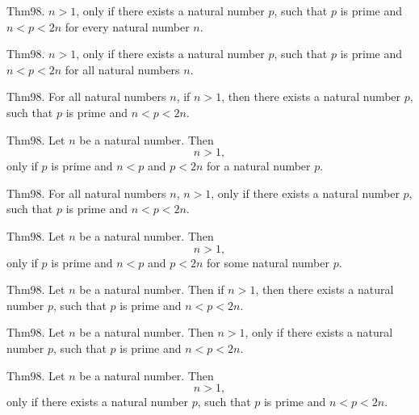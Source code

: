 \documentclass{article}
\begin{document}
Thm98. $n > 1$, only if there exists a natural number $p$, such that $p$ is prime and $n < p < 2 n$ for every natural number $n$.

Thm98. $n > 1$, only if there exists a natural number $p$, such that $p$ is prime and $n < p < 2 n$ for all natural numbers $n$.

Thm98. For all natural numbers $n$, if $n > 1$, then there exists a natural number $p$, such that $p$ is prime and $n < p < 2 n$.

Thm98. Let $n$ be a natural number. Then $$n > 1,$$ only if $p$ is prime and $n < p$ and $p < 2 n$ for a natural number $p$.

Thm98. For all natural numbers $n$, $n > 1$, only if there exists a natural number $p$, such that $p$ is prime and $n < p < 2 n$.

Thm98. Let $n$ be a natural number. Then $$n > 1,$$ only if $p$ is prime and $n < p$ and $p < 2 n$ for some natural number $p$.

Thm98. Let $n$ be a natural number. Then if $n > 1$, then there exists a natural number $p$, such that $p$ is prime and $n < p < 2 n$.

Thm98. Let $n$ be a natural number. Then $n > 1$, only if there exists a natural number $p$, such that $p$ is prime and $n < p < 2 n$.

Thm98. Let $n$ be a natural number. Then $$n > 1,$$ only if there exists a natural number $p$, such that $p$ is prime and $n < p < 2 n$.
\end{document}
